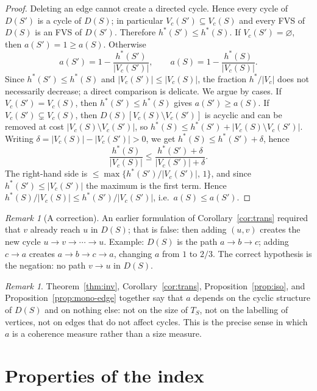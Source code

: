 \documentclass[11pt]{article}
\theoremstyle{definition}
\theoremstyle{remark}
\newtheorem{remark}[theorem]{Remark}
\begin{document}
\begin{proof}
Deleting an edge cannot create a directed cycle. Hence every cycle of $D(S')$ is a cycle of $D(S)$; in particular $V_c(S')\subseteq V_c(S)$ and every FVS of $D(S)$ is an FVS of $D(S')$. Therefore $h^*(S')\le h^*(S)$. If $V_c(S')=\varnothing$, then $a(S')=1\ge a(S)$. Otherwise
\[
a(S')=1-\frac{h^*(S')}{|V_c(S')|},\qquad a(S)=1-\frac{h^*(S)}{|V_c(S)|}.
\]
Since $h^*(S')\le h^*(S)$ and $|V_c(S')|\le|V_c(S)|$, the fraction $h^*/|V_c|$ does not necessarily decrease; a direct comparison is delicate. We argue by cases. If $V_c(S')=V_c(S)$, then $h^*(S')\le h^*(S)$ gives $a(S')\ge a(S)$. If $V_c(S')\subsetneq V_c(S)$, then $D(S)[V_c(S)\setminus V_c(S')]$ is acyclic and can be removed at cost $|V_c(S)\setminus V_c(S')|$, so $h^*(S)\le h^*(S')+|V_c(S)\setminus V_c(S')|$. Writing $\delta=|V_c(S)|-|V_c(S')|>0$, we get $h^*(S)\le h^*(S')+\delta$, hence
\[
\frac{h^*(S)}{|V_c(S)|}\le\frac{h^*(S')+\delta}{|V_c(S')|+\delta}.
\]
The right-hand side is $\le\max\{h^*(S')/|V_c(S')|,\,1\}$, and since $h^*(S')\le|V_c(S')|$ the maximum is the first term. Hence $h^*(S)/|V_c(S)|\le h^*(S')/|V_c(S')|$, i.e.\ $a(S)\le a(S')$.
\end{proof}

\begin{remark}[A correction]\label{rem:correction}
An earlier formulation of Corollary~\ref{cor:trans} required that $v$ already reach $u$ in $D(S)$; that is false: then adding $(u,v)$ creates the new cycle $u\to v\to\cdots\to u$. Example: $D(S)$ is the path $a\to b\to c$; adding $c\to a$ creates $a\to b\to c\to a$, changing $a$ from $1$ to $2/3$. The correct hypothesis is the negation: no path $v\to u$ in $D(S)$.
\end{remark}

\begin{remark}
Theorem~\ref{thm:inv}, Corollary~\ref{cor:trans}, Proposition~\ref{prop:iso}, and Proposition~\ref{prop:mono-edge} together say that $a$ depends on the cyclic structure of $D(S)$ and on nothing else: not on the size of $T_S$, not on the labelling of vertices, not on edges that do not affect cycles. This is the precise sense in which $a$ is a coherence measure rather than a size measure.
\end{remark}

\section{Properties of the index}\label{sec:prop}
\end{document}
